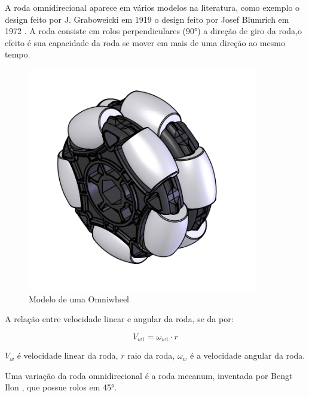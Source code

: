 A roda omnidirecional aparece em vários modelos na literatura, como exemplo o design feito por J. Graboweicki em 1919 \cite{patent_US1305535A}
o design feito por Josef Blumrich em 1972 \cite{patent_US3789947A}.
A roda consiste em rolos perpendiculares (90°) a direção de giro da roda,o efeito é sua capacidade da roda se mover em mais de uma direção ao mesmo tempo.

\begin{figure}[h]
	\centering
	\includegraphics{figures/omniwheel}
	\caption{Modelo de uma Omniwheel \cite{draw_omniwheel}}
\end{figure}

A relação entre velocidade linear e angular da roda, se da por:

\[V_{w1} = \omega_{w1}\cdot r \] 

$V_{w}$ é velocidade linear da roda, $r$ raio da roda, $\omega_{w} $ é a velocidade angular da roda.


Uma variação da roda omnidirecional é a roda mecanum, inventada por Bengt Ilon \cite{patent_US3876255A}, que possue rolos em 45°.

